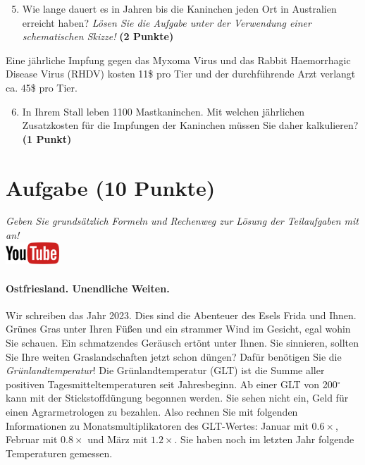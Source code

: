 \documentclass[a4paper, 10pt]{scrartcl}\usepackage[]{graphicx}\usepackage[]{xcolor}
\begin{document}
\begin{enumerate}
  \setcounter{enumi}{4}
\item Wie lange dauert es in Jahren bis die Kaninchen jeden Ort
  in Australien erreicht haben? \textit{L{\"o}sen Sie die Aufgabe unter der
    Verwendung einer schematischen Skizze!} \textbf{(2 Punkte)}
\end{enumerate}

Eine j{\"a}hrliche Impfung gegen das Myxoma Virus und das Rabbit Haemorrhagic
Disease Virus (RHDV) kosten 11\$ pro Tier und der
durchf{\"u}hrende Arzt verlangt ca. 45\$ pro Tier.

\begin{enumerate}
  \setcounter{enumi}{5}
\item In Ihrem Stall leben 1100 Mastkaninchen. Mit welchen
  j{\"a}hrlichen Zusatzkosten f{\"u}r die Impfungen der Kaninchen m{\"u}ssen Sie daher
  kalkulieren? \textbf{(1 Punkt)}
\end{enumerate}
 
\clearpage

\section{Aufgabe \hfill (10 Punkte)}

\textit{Geben Sie grunds{\"a}tzlich Formeln und Rechenweg zur L{\"o}sung der
  Teilaufgaben mit an!} \\[1Ex]

\hfill\href{https://youtu.be/fiWGgCX-cE4}{\includegraphics[width =
  2cm]{img/youtube}} %
\hspace{2Ex}



\paragraph{Ostfriesland. Unendliche Weiten.}



Wir schreiben das Jahr 2023. Dies sind die Abenteuer
des Esels Frida und Ihnen. Gr{\"u}nes Gras unter Ihren F{\"u}{\ss}en und
ein strammer Wind im Gesicht, egal wohin Sie schauen. Ein schmatzendes
Ger{\"a}usch ert{\"o}nt unter Ihnen. Sie sinnieren, sollten Sie Ihre weiten
Graslandschaften jetzt schon d{\"u}ngen?  Daf{\"u}r ben{\"o}tigen Sie die
\textit{Gr{\"u}nlandtemperatur}! Die Gr{\"u}nlandtemperatur (GLT) ist die Summe aller
positiven Tagesmitteltemperaturen seit Jahresbeginn. Ab einer GLT von
200$^\circ$ kann mit der Stickstoffd{\"u}ngung begonnen werden. Sie sehen nicht
ein, Geld f{\"u}r einen Agrarmetrologen zu bezahlen. Also rechnen Sie mit
folgenden Informationen zu Monatsmultiplikatoren des GLT-Wertes: Januar mit
$0.6\times$, Februar mit $0.8\times$ und M{\"a}rz mit
$1.2\times$. Sie haben noch im letzten Jahr folgende Temperaturen
gemessen.
\end{document}
